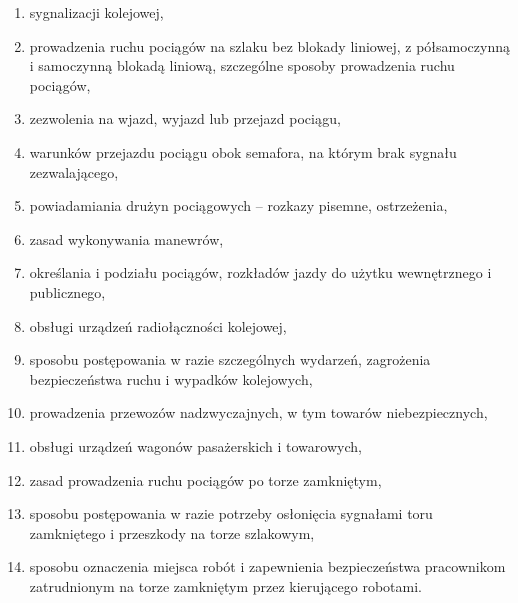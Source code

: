 \documentclass[usenames,dvipsnames,svgnames,table,a4paper,openany,justified]{kaobook}
\begin{document}
\begin{enumerate}
\begin{enumerate}
\begin{enumerate}
 			\item sygnalizacji kolejowej,
 			\item prowadzenia ruchu pociągów na szlaku bez blokady liniowej, z półsamoczynną i
 			samoczynną blokadą liniową, szczególne sposoby prowadzenia ruchu pociągów,
 			\item zezwolenia na wjazd, wyjazd lub przejazd pociągu,
 			\item warunków przejazdu pociągu obok semafora, na którym brak sygnału zezwalającego,
 			\item powiadamiania drużyn pociągowych – rozkazy pisemne, ostrzeżenia,
 			\item zasad wykonywania manewrów,
 			\item określania i podziału pociągów, rozkładów jazdy do użytku wewnętrznego i publicznego,
 			\item obsługi urządzeń radiołączności kolejowej, 
 			\item sposobu postępowania w razie szczególnych wydarzeń, zagrożenia bezpieczeństwa
 			ruchu i wypadków kolejowych,
 			\item prowadzenia przewozów nadzwyczajnych, w tym towarów niebezpiecznych,
 			\item obsługi urządzeń wagonów pasażerskich i towarowych,
 			\item zasad prowadzenia ruchu pociągów po torze zamkniętym,
 			\item sposobu postępowania w razie potrzeby osłonięcia sygnałami toru zamkniętego i
 			przeszkody na torze szlakowym,
 			\item sposobu oznaczenia miejsca robót i zapewnienia bezpieczeństwa pracownikom
 			zatrudnionym na torze zamkniętym przez kierującego robotami.
 			\end{enumerate}
 	\end{enumerate}
\end{enumerate}
\end{document}
